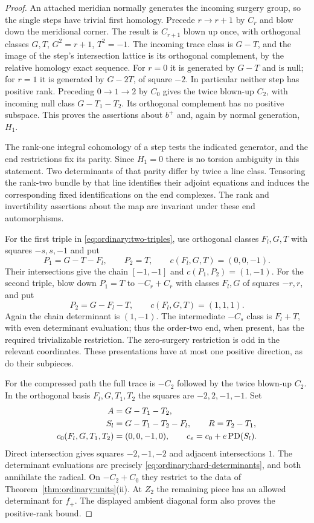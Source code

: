 \begin{proof}
An attached meridian normally generates the incoming surgery
group, so the single steps have trivial first homology.  Precede
$r\to r+1$ by $C_r$ and blow down the meridional corner.  The
result is $C_{r+1}$ blown up once, with orthogonal classes
$G,T$, $G^2=r+1$, $T^2=-1$.  The incoming trace class is
$G-T$, and the image of the step's intersection lattice is its
orthogonal complement, by the relative homology exact sequence.
For $r=0$ it is generated by $G-T$ and is null; for $r=1$ it
is generated by $G-2T$, of square $-2$.  In particular neither
step has positive rank.  Preceding $0\to1\to2$ by $C_0$
gives the twice blown-up $C_2$, with incoming null class
$G-T_1-T_2$.  Its orthogonal complement has no positive
subspace.  This proves the assertions about $b^+$ and, again
by normal generation, $H_1$.

The rank-one integral cohomology of a step tests the indicated
generator, and the end restrictions fix its parity.  Since
$H_1=0$ there is no torsion ambiguity in this statement.  Two
determinants of that parity differ by twice a line class.
Tensoring the rank-two bundle by that line identifies their
adjoint equations and induces the corresponding fixed
identifications on the end complexes.  The rank and
invertibility assertions about the map are invariant under
these end automorphisms.

For the first triple in \eqref{eq:ordinary:two-triples}, use
orthogonal classes $F_l,G,T$ with squares $-s,s,-1$ and put
\[
 P_1=G-T-F_l,\qquad P_2=T,
 \qquad c(F_l,G,T)=(0,0,-1).
\]
Their intersections give the chain $[-1,-1]$ and
$c(P_1,P_2)=(1,-1)$.  For the second triple, blow down
$P_1=T$ to $-C_r+C_r$ with classes $F_l,G$ of squares
$-r,r$, and put
\[
 P_2=G-F_l-T,\qquad
 c(F_l,G,T)=(1,1,1).
\]
Again the chain determinant is $(1,-1)$.  The intermediate
$-C_s$ class is $F_l+T$, with even determinant evaluation;
thus the order-two end, when present, has the required
trivializable restriction.  The zero-surgery restriction is
odd in the relevant coordinates.  These presentations have
at most one positive direction, as do their subpieces.

For the compressed path the full trace is $-C_2$ followed by
the twice blown-up $C_2$.  In the orthogonal basis
$F_l,G,T_1,T_2$ the squares are $-2,2,-1,-1$.  Set
\begin{equation}\label{eq:ordinary:three-chain}
 \begin{split}
 A&=G-T_1-T_2,\\
 S_l&=G-T_1-T_2-F_l,\qquad R=T_2-T_1,\\
 c_0(F_l,G,T_1,T_2)&=(0,0,-1,0),\qquad
 c_e=c_0+e\operatorname{PD}(S_l).
 \end{split}
\end{equation}
Direct intersection gives squares $-2,-1,-2$ and adjacent
intersections $1$.  The determinant evaluations are precisely
\eqref{eq:ordinary:hard-determinants}, and both annihilate
the radical.  On $-C_2+C_0$ they restrict to the data of
Theorem~\ref{thm:ordinary:units}(ii).  At $Z_2$ the remaining
piece has an allowed determinant for $f_+$.  The displayed
ambient diagonal form also proves the positive-rank bound.
\end{proof}

